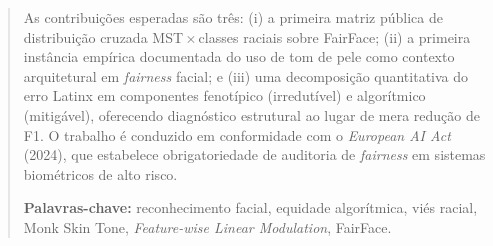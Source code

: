 \begin{abstract}
\noindent As contribuições esperadas são três: (i) a primeira matriz pública de distribuição cruzada MST\,$\times$\,classes raciais sobre FairFace; (ii) a primeira instância empírica documentada do uso de tom de pele como contexto arquitetural em \emph{fairness} facial; e (iii) uma decomposição quantitativa do erro Latinx em componentes fenotípico (irredutível) e algorítmico (mitigável), oferecendo diagnóstico estrutural ao lugar de mera redução de F1. O trabalho é conduzido em conformidade com o \emph{European AI Act} (2024), que estabelece obrigatoriedade de auditoria de \emph{fairness} em sistemas biométricos de alto risco.

\medskip
\noindent\textbf{Palavras-chave:} reconhecimento facial, equidade algorítmica, viés racial, Monk Skin Tone, \emph{Feature-wise Linear Modulation}, FairFace.
\end{abstract}

\vspace{1em}

\begin{abstract}
\end{abstract}

\newpage
